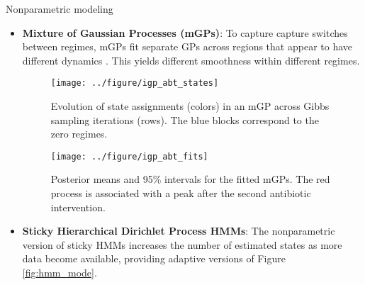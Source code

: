 \documentclass[final, 8pt]{beamer}
\newlength{\onecolwid}
\begin{document}
\begin{frame}
\begin{columns}
\begin{column}{\onecolwid}
\begin{block}{Nonparametric modeling}
\begin{itemize}
\item \textbf{Mixture of Gaussian Processes (mGPs)}: To capture capture switches
  between regimes, mGPs fit separate GPs across regions that appear to have
  different dynamics \citep{ghahramani1998variational, heinonen2016non}. This
  yields different smoothness within different regimes.
\begin{figure}[!p]
  \centering
  \texttt{[image: ../figure/igp\_abt\_states]}
  \caption{Evolution of state assignments (colors) in an mGP across Gibbs
    sampling iterations (rows). The blue blocks correspond to the zero
    regimes. \label{fig:igp_abt_states}}
\end{figure}

\begin{figure}[!p]
  \centering
  \texttt{[image: ../figure/igp\_abt\_fits]}
  \caption{Posterior means and 95\% intervals for the fitted mGPs. The red
    process is associated with a peak after the second antibiotic intervention.
    \label{fig:igp_abt_fits}}
\end{figure}

\item \textbf{Sticky Hierarchical Dirichlet Process HMMs}: The
  nonparametric version of sticky HMMs \citep{fox2011sticky} increases the
  number of estimated states as more data become available, providing adaptive
  versions of Figure \ref{fig:hmm_mode}.
\end{itemize}
\end{block}

\begingroup
    \fontsize{12.5pt}{12.5pt}\selectfont
 
 
 \endgroup
\end{column}
\end{columns}

\end{frame}
\end{document}
